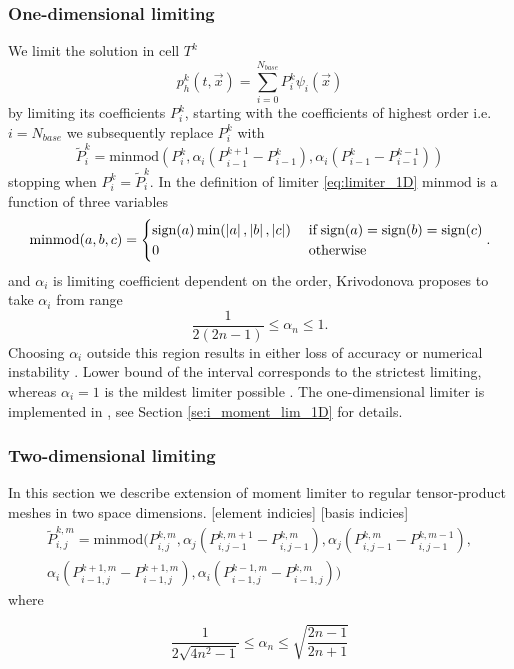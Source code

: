 \subsubsection{One-dimensional limiting}
\label{sse:moment_lim_1D}
We limit the solution in cell $T^k$
\begin{equation}
\label{eq:el_lin_comb_lim}
p_h^k(t, \vec{x}) = \sum\limits_{i=0}^{N_{base}} P_i^k\psi_i(\vec{x})
\end{equation}
by limiting its coefficients $P_i^k$, starting with the coefficients of 
highest order i.e. $i = N_{base}$ we subsequently replace 
$P_i^k$ with
\begin{equation}
\label{eq:limiter_1D}
	\tilde{P}_i^k = \text{minmod}\left(P_i^k, 
						\alpha_i(P_{i-1}^{k+1} - P_{i-1}^k), 
						\alpha_i (P_{i-1}^k - P_{i-1}^{k-1})\right)
\end{equation}
stopping when $P_i^k = \tilde{P}_i^k$. In the definition of limiter \eqref{eq:limiter_1D} 
$\text{minmod}$ is a function of three 
variables
\begin{equation}
	\text{minmod}(a,b,c) = 
	\begin{cases}
			\text{sign}(a)\min(\left\lvert a\right\rvert, \left\lvert b\right\rvert, \left\lvert c\right\rvert) & \;\text{if}\; 	
															\text{sign}(a) =
															\text{sign}(b) = 
															\text{sign}(c)\\
														0 & \;\text{otherwise}
	\end{cases}.
\end{equation}
and $\alpha_i$ is limiting coefficient dependent on the order, Krivodonova 
\cite{Krivodonova2007} proposes to take $\alpha_i$ from range
\begin{equation}
	\frac{1}{2(2n -1)} \leq \alpha_n \leq 1.
\end{equation}
Choosing $\alpha_i$ outside this region results in either loss of accuracy or numerical 
instability \cite[p. 882]{Krivodonova2007}. Lower bound of the interval corresponds to 
the strictest limiting, whereas $\alpha_i = 1$ is the mildest limiter possible \cite[p. 
882]{Krivodonova2007}. The one-dimensional limiter is implemented in 
, see Section \ref{se:i_moment_lim_1D} for details.

\subsubsection{Two-dimensional limiting}
In this section we describe extension of moment limiter to regular tensor-product meshes 
in two space dimensions.
[\todo element indicies]
[\todo basis indicies]
\begin{multline}
\tilde{P}^{k,m}_{i,j} =
	\text{minmod}\big(P^{k,m}_{i,j}, 
					  \alpha_j(P^{k,m+1}_{i,j-1} - P^{k,m}_{i,j-1}),
					  \alpha_j(P^{k,m}_{i,j-1} - P^{k,m-1}_{i,j-1}),\\
					  \alpha_i(P^{k+1,m}_{i-1,j} - P^{k+1,m}_{i-1,j}),
					  \alpha_i(P^{k-1,m}_{i-1,j} - P^{k,m}_{i-1,j})\big)
\end{multline}
where 

\begin{equation}
	\frac{1}{2\sqrt{4n^2 - 1}} \leq \alpha_n \leq \sqrt{\frac{2n - 1}{2n + 1}}
\end{equation} 



